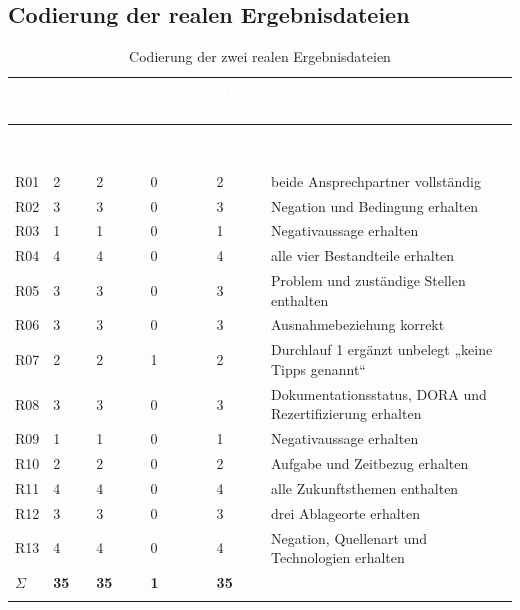 \documentclass[
  10pt,
  ngerman,
  a4paper,
  toc=graduated,
  numbers=noenddot,
  headings=standardclasses,
  nonumberlist
]{scrartcl}
\begin{document}
\clearpage
\subsection{Codierung der realen Ergebnisdateien}
\label{anhang_codierung_real}

\small
\begin{longtable}{L{0.8cm}C{1.4cm}C{1.4cm}C{1.4cm}C{1.4cm}L{8.3cm}}
\toprule
{}
\textcolor{white}{\textbf{ID}} & \textcolor{white}{\textbf{Ref.}} & \textcolor{white}{\textbf{Abd. 1}} & \textcolor{white}{\textbf{Unbel. 1}} & \textcolor{white}{\textbf{Abd. 2}} & \textcolor{white}{\textbf{Kommentar}}\\
\midrule
\endfirsthead
\toprule
{}
\textcolor{white}{\textbf{ID}} & \textcolor{white}{\textbf{Ref.}} & \textcolor{white}{\textbf{Abd. 1}} & \textcolor{white}{\textbf{Unbel. 1}} & \textcolor{white}{\textbf{Abd. 2}} & \textcolor{white}{\textbf{Kommentar}}\\
\midrule
\endhead
R01 & 2 & 2 & 0 & 2 & beide Ansprechpartner vollständig\\
R02 & 3 & 3 & 0 & 3 & Negation und Bedingung erhalten\\
R03 & 1 & 1 & 0 & 1 & Negativaussage erhalten\\
R04 & 4 & 4 & 0 & 4 & alle vier Bestandteile erhalten\\
R05 & 3 & 3 & 0 & 3 & Problem und zuständige Stellen enthalten\\
R06 & 3 & 3 & 0 & 3 & Ausnahmebeziehung korrekt\\
R07 & 2 & 2 & 1 & 2 & Durchlauf 1 ergänzt unbelegt „keine Tipps genannt“\\
R08 & 3 & 3 & 0 & 3 & Dokumentationsstatus, DORA und Rezertifizierung erhalten\\
R09 & 1 & 1 & 0 & 1 & Negativaussage erhalten\\
R10 & 2 & 2 & 0 & 2 & Aufgabe und Zeitbezug erhalten\\
R11 & 4 & 4 & 0 & 4 & alle Zukunftsthemen enthalten\\
R12 & 3 & 3 & 0 & 3 & drei Ablageorte erhalten\\
R13 & 4 & 4 & 0 & 4 & Negation, Quellenart und Technologien erhalten\\
\midrule
\textbf{$\Sigma$} & \textbf{35} & \textbf{35} & \textbf{1} & \textbf{35} & \\
\bottomrule
\caption{Codierung der zwei realen Ergebnisdateien}
\label{tab:codierung_real}
\end{longtable}
\normalsize
\end{document}
